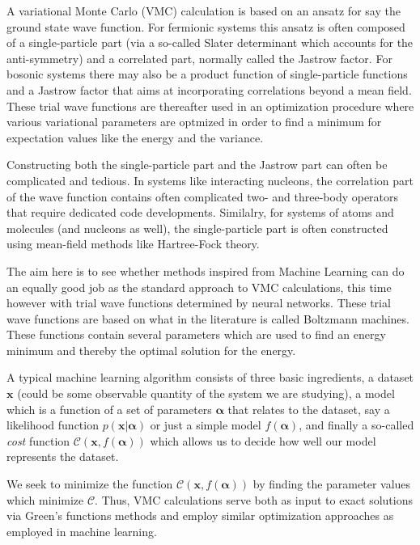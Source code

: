 \documentclass[10pt]{article}
\begin{document}
A variational Monte Carlo (VMC) calculation is based on an ansatz for
say the ground state wave function.  For fermionic systems this ansatz
is often composed of a single-particle part (via a so-called Slater
determinant which accounts for the anti-symmetry) and a correlated
part, normally called the Jastrow factor.  For bosonic systems there
may also be a product function of single-particle functions and a
Jastrow factor that aims at incorporating correlations beyond a mean
field.  These trial wave functions are thereafter used in an
optimization procedure where various variational parameters are
optmized in order to find a minimum for expectation values like the
energy and the variance.

Constructing both the single-particle part and the Jastrow part can
often be complicated and tedious.  In systems like interacting
nucleons, the correlation part of the wave function contains often
complicated two- and three-body operators that require dedicated code
developments. Similalry, for systems of atoms and molecules (and
nucleons as well), the single-particle part is often constructed using
mean-field methods like Hartree-Fock theory.

The aim here is to see whether methods inspired from Machine Learning
can do an equally good job as the standard approach to VMC
calculations, this time however with trial wave functions determined
by neural networks.  These trial wave functions 
are based on what in the literature is called Boltzmann
machines. These functions contain several parameters which are used to
find an energy minimum and thereby the optimal solution for the
energy.

A typical machine learning algorithm consists of three basic
ingredients, a dataset $\mathbf{x}$ (could be some observable quantity
of the system we are studying), a model which is a function of a set
of parameters $\mathbf{\alpha}$ that relates to the dataset, say a
likelihood function $p(\mathbf{x}\vert \mathbf{\alpha})$ or just a
simple model $f(\mathbf{\alpha})$, and finally a so-called {\em cost}
function $\mathcal{C} (\mathbf{x}, f(\mathbf{\alpha}))$ which allows
us to decide how well our model represents the dataset.

We seek to minimize the function $\mathcal{C} (\mathbf{x},
f(\mathbf{\alpha}))$ by finding the parameter values which minimize
$\mathcal{C}$. Thus, VMC calculations serve both as input to exact
solutions via Green's functions methods and employ similar
optimization approaches as employed in machine learning.  
\end{document}
